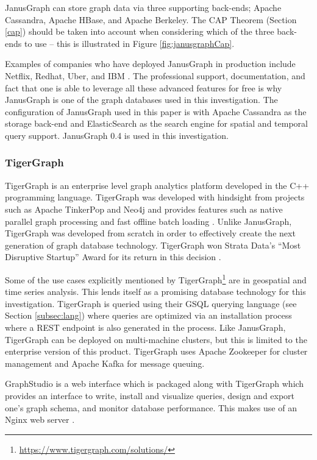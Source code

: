 JanusGraph can store graph data via three supporting back-ends; Apache Cassandra, Apache HBase, and Apache Berkeley. The CAP Theorem (Section \ref{cap}) should be taken into account when considering which of the three back-ends to use -- this is illustrated in Figure \ref{fig:janusgraphCap}.

Examples of companies who have deployed JanusGraph in production include Netflix, Redhat, Uber, and IBM \cite{janusgraphReadme}. The professional support, documentation, and fact that one is able to leverage all these advanced features for free is why JanusGraph is one of the graph databases used in this investigation. The configuration of JanusGraph used in this paper is with Apache Cassandra as the storage back-end and ElasticSearch as the search engine for spatial and temporal query support. JanusGraph 0.4 is used in this investigation.

\subsubsection{TigerGraph}

TigerGraph is an enterprise level graph analytics platform developed in the C++ programming language. TigerGraph was developed with hindsight from projects such as Apache TinkerPop and Neo4j and provides features such as native parallel graph processing and fast offline batch loading \cite{tigergraphBenchmark} \cite{conferenceTrip}. Unlike JanusGraph, TigerGraph was developed from scratch in order to effectively create the next generation of graph database technology. TigerGraph won Strata Data’s ``Most Disruptive Startup'' Award for its return in this decision \cite{tigergraphAward}.

Some of the use cases explicitly mentioned by TigerGraph\footnote{\url{https://www.tigergraph.com/solutions/}} are in geospatial and time series analysis. This lends itself as a promising database technology for this investigation. TigerGraph is queried using their GSQL querying language (see Section \ref{subsec:lang}) where queries are optimized via an installation process where a REST endpoint is also generated in the process. Like JanusGraph, TigerGraph can be deployed on multi-machine clusters, but this is limited to the enterprise version of this product. TigerGraph uses Apache Zookeeper for cluster management and Apache Kafka for message queuing.

GraphStudio is a web interface which is packaged along with TigerGraph which provides an interface to write, install and visualize queries, design and export one's graph schema, and monitor database performance. This makes use of an Nginx web server \cite{tigergraphInfoworld}.

